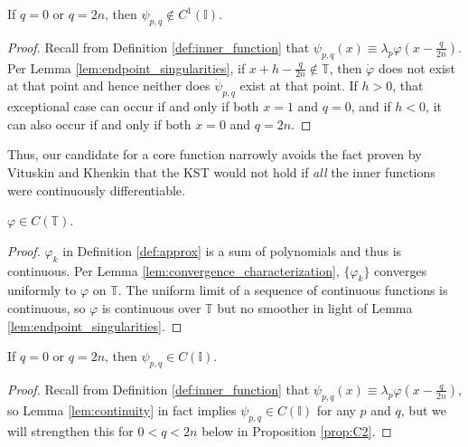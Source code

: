 \begin{proposition}[]
  \label{prop:q=0}
  If $q = 0$ or $q = 2n$, then $\psi_{p,q} \notin C^1\left(\mathbb{I}\right)$.
\end{proposition}
  
\begin{proof}
  Recall from Definition \ref{def:inner_function} that $\psi_{p,q}\left(x\right) \equiv \lambda_p \varphi\left(x - \frac{q}{2n}\right)$. Per Lemma \ref{lem:endpoint_singularities}, if $x + h - \frac{q}{2n} \notin \mathbb{T}$, then $\dot{\varphi}$ does not exist at that point and hence neither does $\dot{\psi}_{p,q}$ exist at that point. If $h > 0$, that exceptional case can occur if and only if both $x = 1$ and $q = 0$, and if $h < 0$, it can also occur if and only if both $x = 0$ and $q = 2n$.
\end{proof}
\begin{remark*}
Thus, our candidate for a core function narrowly avoids the fact proven by Vituskin and Khenkin that the KST would not hold if \emph{all} the inner functions were continuously differentiable.     
\end{remark*}
\begin{lemma}
  \label{lem:continuity}
  $\varphi \in C\left(\mathbb{T}\right)$.
\end{lemma}
\begin{proof}
  $\varphi_k$ in Definition \ref{def:approx} is a sum of polynomials and thus is continuous. Per Lemma \ref{lem:convergence_characterization}, $\{\varphi_k\}$ converges uniformly to $\varphi$ on $\mathbb{T}$. The uniform limit of a sequence of continuous functions is continuous, so $\varphi$ is continuous over $\mathbb{T}$ but no smoother in light of Lemma \ref{lem:endpoint_singularities}.
\end{proof}

\begin{lemma}
  \label{lem:end_continuity}
  If $q = 0$ or $q = 2n$, then $\psi_{p,q} \in C\left(\mathbb{I}\right)$.
\end{lemma}
\begin{proof}
  Recall from Definition \ref{def:inner_function} that $\psi_{p,q}\left(x\right) \equiv \lambda_p \varphi\left(x - \frac{q}{2n}\right)$, so Lemma \ref{lem:continuity} in fact implies $\psi_{p,q} \in C\left(\mathbb{I}\right)$ for any $p$ and $q$, but we will strengthen this for $0 < q < 2n$ below in Proposition \ref{prop:C2}.
\end{proof}

